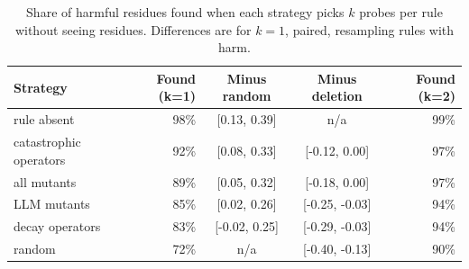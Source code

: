 \begin{table}[t]
\centering\small\setlength{\tabcolsep}{4pt}
\caption{Share of harmful residues found when each strategy picks $k$ probes per rule without seeing residues. Differences are for $k=1$, paired, resampling rules with harm.}\label{tab:selection}
\begin{tabular}{lrccr}
\toprule
Strategy & Found (k=1) & Minus random & Minus deletion & Found (k=2) \\
\midrule
rule absent & 98\% & [0.13, 0.39] & n/a & 99\% \\
catastrophic operators & 92\% & [0.08, 0.33] & [-0.12, 0.00] & 97\% \\
all mutants & 89\% & [0.05, 0.32] & [-0.18, 0.00] & 97\% \\
LLM mutants & 85\% & [0.02, 0.26] & [-0.25, -0.03] & 94\% \\
decay operators & 83\% & [-0.02, 0.25] & [-0.29, -0.03] & 94\% \\
random & 72\% & n/a & [-0.40, -0.13] & 90\% \\
\bottomrule
\end{tabular}
\end{table}
